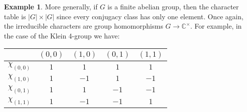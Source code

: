 \documentclass[12pt]{article}
\theoremstyle{plain}
\theoremstyle{definition}
\newtheorem{example}[theorem]{Example}
\theoremstyle{remark}
\numberwithin{equation}{section}
\begin{document}
\begin{example}
More generally, if $G$ is a finite abelian group, then
the character table is $|G| \times |G|$ since every conjugacy class has
only one element.
Once again, the irreducible characters are group homomorphisms
$G \to \mathbb{C}^\times$.
For example, in the case of the Klein 4-group we have:
\begin{center}
\begin{tabular}{|c|c|c|c|c|}
\hline 
 & $(0,0)$ & $(1,0)$ & $(0,1)$ & $(1,1)$\\
\hline 
\hline 
$\chi_{(0,0)}$ & $1$ & $1$ & $1$ & $1$\\
\hline 
$\chi_{(1,0)}$ & $1$ & $-1$ & $1$ & $-1$\\
\hline 
$\chi_{(0,1)}$ & $1$ & $1$ & $-1$ & $-1$\\
\hline 
$\chi_{(1,1)}$ & $1$ & $-1$ & $-1$ & $1$\\
\hline
\end{tabular}
\end{center}
\end{example}
\end{document}
